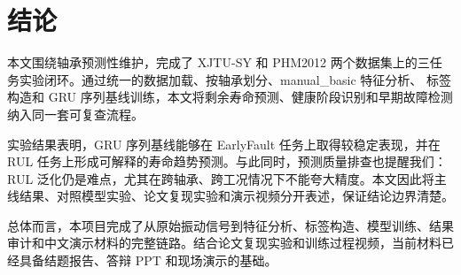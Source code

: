 \section{结论}

本文围绕轴承预测性维护，完成了 XJTU-SY 和 PHM2012 两个数据集上的三任务实验闭环。通过统一的数据加载、按轴承划分、manual\_basic 特征分析、 标签构造和 GRU 序列基线训练，本文将剩余寿命预测、健康阶段识别和早期故障检测纳入同一套可复查流程。

实验结果表明，GRU 序列基线能够在 EarlyFault 任务上取得较稳定表现，并在 RUL 任务上形成可解释的寿命趋势预测。与此同时，预测质量排查也提醒我们：RUL 泛化仍是难点，尤其在跨轴承、跨工况情况下不能夸大精度。本文因此将主线结果、对照模型实验、论文复现实验和演示视频分开表述，保证结论边界清楚。

总体而言，本项目完成了从原始振动信号到特征分析、标签构造、模型训练、结果审计和中文演示材料的完整链路。结合论文复现实验和训练过程视频，当前材料已经具备结题报告、答辩 PPT 和现场演示的基础。
